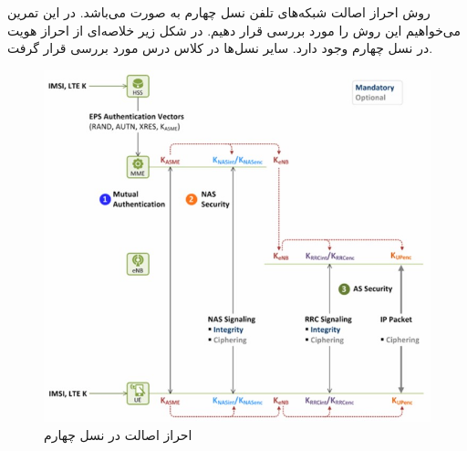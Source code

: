 \Problem
{}
{
روش احراز اصالت شبکه‌های تلفن نسل چهارم به صورت
می‌باشد.
در این تمرین می‌خواهیم این روش را مورد بررسی قرار دهیم.
در شکل زیر خلاصه‌ای از احراز هویت در نسل چهارم وجود دارد.
سایر نسل‌ها در کلاس درس مورد بررسی قرار گرفت.

\begin{figure}[H]
    \includegraphics[width=15cm]{Images/IMG_01.jpg}
    \centering
    \caption{احراز اصالت در نسل چهارم}
\end{figure}

}
